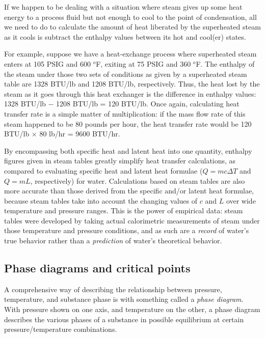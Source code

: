 \vskip 10pt

If we happen to be dealing with a situation where steam gives up some heat energy to a process fluid but not enough to cool to the point of condensation, all we need to do to calculate the amount of heat liberated by the superheated steam as it cools is subtract the enthalpy values between its hot and cool(er) states.  

For example, suppose we have a heat-exchange process where superheated steam enters at 105 PSIG and 600 $^{o}$F, exiting at 75 PSIG and 360 $^{o}$F.  The enthalpy of the steam under those two sets of conditions as given by a superheated steam table are 1328 BTU/lb and 1208 BTU/lb, respectively.  Thus, the heat lost by the steam as it goes through this heat exchanger is the difference in enthalpy values: 1328 BTU/lb $-$ 1208 BTU/lb = 120 BTU/lb.  Once again, calculating heat transfer rate is a simple matter of multiplication: if the mass flow rate of this steam happened to be 80 pounds per hour, the heat transfer rate would be 120 BTU/lb $\times$ 80 lb/hr = 9600 BTU/hr.

\vskip 10pt

By encompassing both specific heat and latent heat into one quantity, enthalpy figures given in steam tables greatly simplify heat transfer calculations, as compared to evaluating specific heat and latent heat formulae ($Q = mc \Delta T$ and $Q = mL$, respectively) for water.  Calculations based on steam tables are also more accurate than those derived from the specific and/or latent heat formulae, because steam tables take into account the changing values of $c$ and $L$ over wide temperature and pressure ranges.  This is the power of empirical data: steam tables were developed by taking actual calorimetric measurements of steam under those temperature and pressure conditions, and as such are a \textit{record} of water's true behavior rather than a \textit{prediction} of water's theoretical behavior.








\filbreak
\subsection{Phase diagrams and critical points}

A comprehensive way of describing the relationship between pressure, temperature, and substance phase is with something called a \textit{phase diagram}.  With pressure shown on one axis, and temperature on the other, a phase diagram describes the various phases of a substance in possible equilibrium at certain pressure/temperature combinations.

